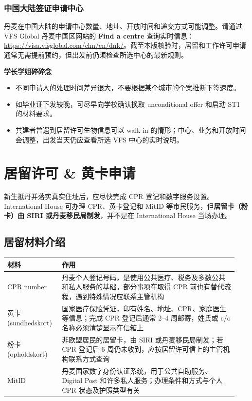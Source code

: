 \subsubsection{中国大陆签证申请中心}

丹麦在中国大陆的申请中心数量、地址、开放时间和递交方式可能调整。请通过 VFS Global 丹麦中国区网站的 \textbf{Find a centre} 查询实时信息：\url{https://visa.vfsglobal.com/chn/en/dnk/}。截至本版核验时，居留和工作许可申请通常无需提前预约，但出发前仍须检查所选中心的最新规则。



\begin{grayleftbox}{\textbf{学长学姐碎碎念}}
\experiencenotice
\begin{itemize}
\item 不同申请人的处理时间差异很大，不要根据某个城市的个案推断下签速度。
\item 如毕业证下发较晚，可尽早向学校确认换取 unconditional offer 和启动 ST1 的材料要求。
\item 共建者曾遇到居留许可生物信息可以 walk-in 的情形；中心、业务和开放时间会调整，出发当天仍应查看所选 VFS 中心的实时说明。
  \end{itemize}
\end{grayleftbox}


\section{居留许可 \& 黄卡申请}

新生抵丹并落实真实住址后，应尽快完成 CPR 登记和数字服务设置。International House 可办理 CPR、黄卡登记和 MitID 等市民服务，但\textbf{居留卡（粉卡）由 SIRI 或丹麦移民局制发}，并不是在 International House 当场办理。

\subsection{居留材料介绍}

\small
\begin{longtable}{p{0.22\linewidth}p{0.72\linewidth}}
\toprule
\rowcolor{gray!10} %
\textbf{材料} & \textbf{作用} \\
\midrule
\endhead
CPR number & 丹麦个人登记号码，是使用公共医疗、税务及多数公共和私人服务的基础。部分事项在取得 CPR 前也有替代流程，遇到特殊情况应联系主管机构 \\
黄卡 (sundhedskort) & 国家医疗保险凭证，印有姓名、地址、CPR、家庭医生等信息；完成 CPR 登记后通常 2--4 周邮寄，姓氏或 c/o 名称必须清楚显示在信箱上 \\
粉卡 (opholdskort) & 非欧盟居民的居留卡，由 SIRI 或丹麦移民局制发；若 CPR 登记后 6 周仍未收到，应按居留许可信上的主管机构联系方式查询 \\
MitID & 丹麦国家数字身份认证系统，用于公共自助服务、Digital Post 和许多私人服务；办理条件和方式与个人 CPR 状态及护照类型有关 \\
\bottomrule
\end{longtable}
\normalsize

